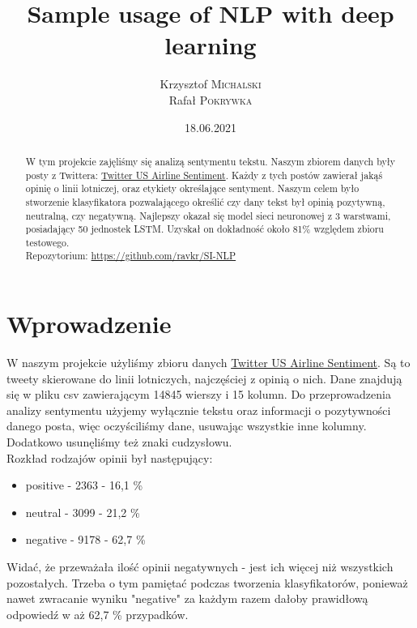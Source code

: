 \documentclass[11pt, a4paper, notitlepage]{report}
\author{Krzysztof \textsc{Michalski} \\ Rafał \textsc{Pokrywka} }
\title{\textbf{Sample usage of NLP with deep learning}}
\date{18.06.2021}
\begin{document}
\clearpage\maketitle
\thispagestyle{empty}
\begin{abstract}
	W tym projekcie zajęliśmy się analizą sentymentu tekstu. Naszym zbiorem danych były posty z Twittera: \href{https://www.kaggle.com/crowdflower/twitter-airline-sentiment}{Twitter US Airline Sentiment}. Każdy z tych postów zawierał jakąś opinię o linii lotniczej, oraz etykiety określające sentyment.
	Naszym celem było stworzenie klasyfikatora pozwalającego określić czy dany tekst był opinią pozytywną, neutralną, czy negatywną. Najlepszy okazał się model sieci neuronowej z 3 warstwami, posiadający 50 jednostek LSTM. Uzyskał on dokładność około 81\% względem zbioru testowego. \\

	Repozytorium: \href{https://github.com/ravkr/SI-NLP}{https://github.com/ravkr/SI-NLP}
\end{abstract}

\clearpage \tableofcontents
\thispagestyle{empty}

\setcounter{page}{1}

\chapter{Wprowadzenie}
W naszym projekcie użyliśmy zbioru danych \href{https://www.kaggle.com/crowdflower/twitter-airline-sentiment}{Twitter US Airline Sentiment}. Są to tweety skierowane do linii lotniczych, najczęściej z opinią o nich. Dane znajdują się w pliku csv zawierającym 14845 wierszy i 15 kolumn. Do przeprowadzenia analizy sentymentu użyjemy wyłącznie tekstu oraz informacji o pozytywności danego posta, więc oczyściliśmy dane, usuwając wszystkie inne kolumny. Dodatkowo usunęliśmy też znaki cudzysłowu.
\\
Rozkład rodzajów opinii był następujący:
\begin{itemize}
    \item positive - 2363 - 16,1 \%
    \item neutral - 3099 - 21,2 \%
    \item negative - 9178 - 62,7 \%
\end{itemize}
Widać, że przeważała ilość opinii negatywnych - jest ich więcej niż wszystkich pozostałych. Trzeba o tym pamiętać podczas tworzenia klasyfikatorów, ponieważ nawet zwracanie wyniku "negative" za każdym razem dałoby prawidłową odpowiedź w aż 62,7 \% przypadków.
\end{document}
